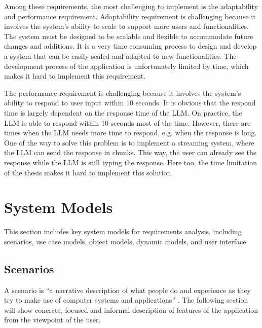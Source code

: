 Among these requirements, the most challenging to implement is the adaptability and performance requirement.
Adaptability requirement is challenging because it involves the system's ability to scale to support more users and functionalities.
The system must be designed to be scalable and flexible to accommodate future changes and additions.
It is a very time consuming process to design and develop a system that can be easily scaled and adapted to new functionalities.
The development process of the application is unfortunately limited by time, which makes it hard to implement this requirement.

The performance requirement is challenging because it involves the system's ability to respond to user input within 10 seconds.
It is obvious that the respond time is largely dependent on the response time of the \ac{LLM}.
On practice, the \ac{LLM} is able to respond within 10 seconds most of the time.
However, there are times when the \ac{LLM} needs more time to respond, e.g. when the response is long.
One of the way to solve this problem is to implement a streaming system, where the \ac{LLM} can send the response in chunks.
This way, the user can already see the response while the \ac{LLM} is still typing the response.
Here too, the time limitation of the thesis makes it hard to implement this solution.


\section{System Models}


This section includes key system models for requirements analysis, including scenarios, use case models, object models, dynamic models, and user interface.

\subsection{Scenarios}

A scenario is “a narrative description of what people do and experience as they try to make use of computer systems and applications” \cite{Carroll1995}. 
The following section will show concrete, focused and informal description of features of the application from the viewpoint of the user. 


